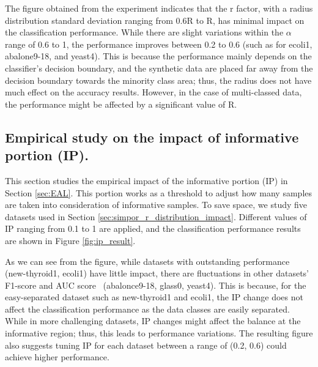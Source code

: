 The figure obtained from the experiment indicates that the r factor, with a radius distribution standard deviation ranging from 0.6R to R, has minimal impact on the classification performance. While there are slight variations within the $\alpha$ range of 0.6 to 1, the performance improves between 0.2 to 0.6 (such as for ecoli1, abalone9-18, and yeast4). This is because the performance mainly depends on the classifier's decision boundary, and the synthetic data are placed far away from the decision boundary towards the minority class area; thus,  the radius does not have much effect on the accuracy results. However, in the case of multi-classed data, the performance might be affected by a significant value of R. 

\subsection{Empirical study on the impact of informative portion (IP).}
This section studies the empirical impact of the informative portion (IP) in Section \ref{sec:EAL}. This portion works as a threshold to adjust how many samples are taken into consideration of informative samples. To save space, we study five datasets used in Section \ref{sec:simpor_r_distribution_impact}. Different values of IP ranging from 0.1 to 1 are applied, and the classification performance results are shown in Figure \ref{fig:ip_result}.


As we can see from the figure, while datasets with outstanding performance (new-thyroid1, ecoli1) have little impact, there are fluctuations in other datasets' F1-score and AUC score  (abalonce9-18, glass0, yeast4). This is because, for the easy-separated dataset such as new-thyroid1 and ecoli1, the IP change does not affect the classification performance as the data classes are easily separated. While in more challenging datasets, IP changes might affect the balance at the informative region; thus, this leads to performance variations. The resulting figure also suggests tuning IP for each dataset between a range of (0.2, 0.6) could achieve higher performance.



